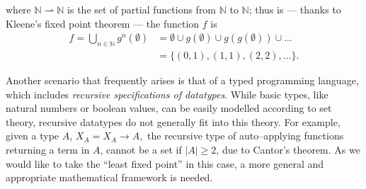 where \(\mathbb{N} \rightharpoonup \mathbb{N}\) is the set of partial functions from \(\mathbb{N}\) to \(\mathbb{N}\); thus is --- thanks to Kleene's fixed point theorem --- the function \(f\) is
\begin{align*}
  f = \bigcup_{n\in\mathbb{N}}g^n(\emptyset) &= \emptyset \cup g(\emptyset) \cup g(g(\emptyset)) \cup \dotsc \\
  &= \lbrace (0,1), (1,1), (2,2), \dotsc \rbrace.
\end{align*}

Another scenario that frequently arises is that of a typed programming language, which includes \emph{recursive specifications of datatypes}.
While basic types, like natural numbers or boolean values, can be easily modelled according to set theory, recursive datatypes do not generally fit into this theory.
For example, given a type \(A\),
\(X_A = X_A \to A,\)
the recursive type of auto--applying functions returning a term in \(A\), cannot be a set if \(\lvert A \rvert \ge 2\), due to Cantor's theorem.
As we would like to take the ``least fixed point'' in this case, a more general and appropriate mathematical framework is needed.

